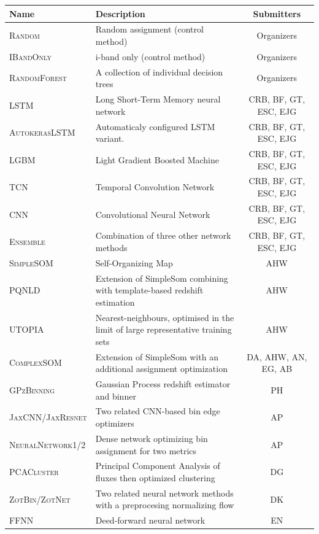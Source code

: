 \documentclass[twocolumn,twocolappendix]{aastex63}
\begin{document}
\begin{table}[]
	\begin{tabular}{|l|p{8cm}|c|}
	\hline
	\textbf{Name} & \textbf{Description} & \textbf{Submitters} \\
	\hline
	\textsc{Random} & Random assignment (control method)  & Organizers \\
	\textsc{IBandOnly} & i-band only (control method)  & Organizers \\
	\textsc{RandomForest} & A collection of individual decision trees & Organizers \\
	\textsc{LSTM} & Long Short-Term Memory neural network & CRB, BF, GT, ESC, EJG \\
	\textsc{AutokerasLSTM}\tablenotemark{a} & Automaticaly configured LSTM variant. & CRB, BF, GT, ESC, EJG \\
	\textsc{LGBM} & Light Gradient Boosted Machine & CRB, BF, GT, ESC, EJG \\
	\textsc{TCN} & Temporal Convolution Network & CRB, BF, GT, ESC, EJG \\
	\textsc{CNN} & Convolutional Neural Network & CRB, BF, GT, ESC, EJG \\
	\textsc{Ensemble} & Combination of three other network methods & CRB, BF, GT, ESC, EJG \\
	\textsc{SimpleSOM} & Self-Organizing Map & AHW \\
	\textsc{PQNLD} & Extension of {\sc SimpleSom} combining with template-based redshift estimation & AHW \\
	\textsc{UTOPIA} & Nearest-neighbours, optimised in the limit of large representative training sets & AHW \\
	\textsc{ComplexSOM} & Extension of {\sc SimpleSom} with an additional assignment optimization & DA, AHW, AN, EG, AB \\
	\textsc{GPzBinning} & Gaussian Process redshift estimator and binner & PH \\
	\textsc{JaxCNN/JaxResnet} & Two related CNN-based bin edge optimizers & AP \\
	\textsc{NeuralNetwork1/2} & Dense network optimizing bin assignment for two metrics & AP \\
	\textsc{PCACluster} & Principal Component Analysis of fluxes then optimized clustering & DG \\
	\textsc{ZotBin/ZotNet} & Two related neural network methods with a preprocesing normalizing flow & DK \\
	\textsc{FFNN} & Deed-forward neural network & EN \\

\end{tabular}
\end{table}
\end{document}

